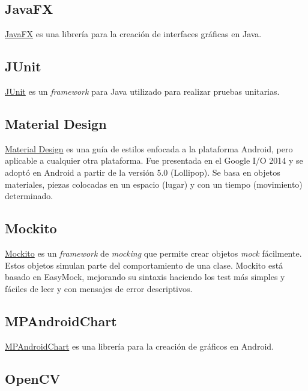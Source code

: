 \subsection{JavaFX}\label{javafx}

\href{http://docs.oracle.com/javase/8/javase-clienttechnologies.htm}{JavaFX}
es una librería para la creación de interfaces gráficas en Java.

\subsection{JUnit}\label{junit}

\href{http://junit.org/junit4/}{JUnit} es un \emph{framework} para Java
utilizado para realizar pruebas unitarias.

\subsection{Material Design}\label{material-design}

\href{https://material.io/guidelines/}{Material Design} es una guía de
estilos enfocada a la plataforma Android, pero aplicable a cualquier
otra plataforma. Fue presentada en el Google I/O 2014 y se adoptó en
Android a partir de la versión 5.0 (Lollipop). Se basa en objetos
materiales, piezas colocadas en un espacio (lugar) y con un tiempo
(movimiento) determinado.

\subsection{Mockito}\label{mockito}

\href{http://mockito.org/}{Mockito} es un \emph{framework} de
\emph{mocking} que permite crear objetos \emph{mock} fácilmente. Estos
objetos simulan parte del comportamiento de una clase. Mockito está
basado en EasyMock, mejorando su sintaxis haciendo los test más simples
y fáciles de leer y con mensajes de error descriptivos.

\subsection{MPAndroidChart}\label{mpandroidchart}

\href{https://github.com/PhilJay/MPAndroidChart}{MPAndroidChart} es una
librería para la creación de gráficos en Android.

\subsection{OpenCV}\label{opencv}


